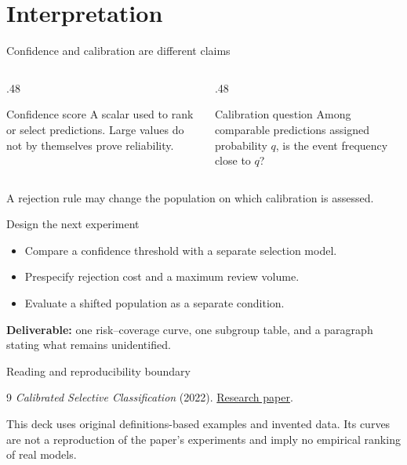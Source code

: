 \documentclass[10pt,aspectratio=169]{beamer}
\begin{document}
\section{Interpretation}
\begin{frame}{Confidence and calibration are different claims}
\begin{columns}[T]
\begin{column}{.48\textwidth}\begin{block}{Confidence score}
A scalar used to rank or select predictions. Large values do not by themselves prove reliability.
\end{block}\end{column}
\begin{column}{.48\textwidth}\begin{exampleblock}{Calibration question}
Among comparable predictions assigned probability $q$, is the event frequency close to $q$?
\end{exampleblock}\end{column}
\end{columns}
A rejection rule may change the population on which calibration is assessed.
\end{frame}
\begin{frame}{Design the next experiment}
\begin{itemize}
\item Compare a confidence threshold with a separate selection model.
\item Prespecify rejection cost and a maximum review volume.
\item Evaluate a shifted population as a separate condition.
\end{itemize}
\bigskip
\textbf{Deliverable:} one risk--coverage curve, one subgroup table, and a paragraph stating what remains unidentified.
\end{frame}
\appendix
\begin{frame}{Reading and reproducibility boundary}
\small
\begin{thebibliography}{9}
 \emph{Calibrated Selective Classification} (2022).
\href{https://arxiv.org/abs/2208.12084}{Research paper}.
\end{thebibliography}
This deck uses original definitions-based examples and invented data. Its curves are not a reproduction of the paper's experiments and imply no empirical ranking of real models.
\end{frame}
\end{document}
